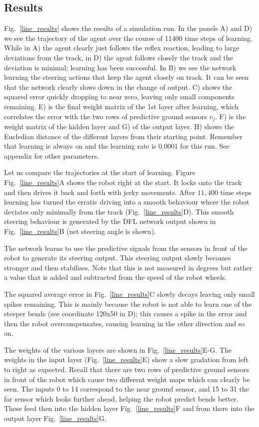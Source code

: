 \documentclass{llncs}
\begin{document}
\subsection{Results}
Fig.~\ref{line_results} shows the results of a simulation run. In the panels
A) and D) we see the trajectory of the agent over the course of 11400 time steps 
of learning. While in A) the agent clearly
just follows the reflex reaction, leading to large deviations from the track,
in D) the agent follows closely the track and the deviation is minimal;
learning has been successful. In B) we see the network learning the steering actions that keep the agent closely on track.
It can be seen that the network clearly slows down in the change of output.
C) shows the squared error quickly dropping to near zero, leaving only small 
components remaining. E) is the final weight matrix of the 1st layer after learning, 
which correlates the error with the two rows of
predictive ground sensors $v_j$. F) is the weight matrix of the hidden layer and G)
of the output layer. H) shows the Eucledian distance of the
different layers from their starting point. Remember that learning is
always on and the learning rate is 0.0001 for this run. See appendix
for other parameters.

Let us compare the trajectories at the start of learning. Figure
Fig.~\ref{line_results}A shows the robot right at the start. It locks
onto the track and then drives it back and forth with jerky
movements. After $11,400$ time steps learning has turned the erratic
driving into a smooth behaviour where the robot deviates only
minimally from the track (Fig.~\ref{line_results}D). This smooth
steering behaviour is generated by the DFL network output 
shown in Fig.~\ref{line_results}B (net steering angle is shown).

The network learns to use the predictive signals from the sensors in
front of the robot to generate its steering output.  This steering 
output slowly becomes stronger and
then stabilises. Note that this is not
measured in degrees but rather a value that is added and subtracted from the
speed of the robot wheels.

The squared average error in Fig.~\ref{line_results}C slowly decays
leaving only small spikes remaining. This is mainly because
the robot is not able to learn one of the steeper bends (see
coordinate 120x50 in D); this causes a spike in the error and
then the robot overcompensates, causing learning in the
other direction and so on.

The weights of the various layers are shown in
Fig.~\ref{line_results}E-G.  The weights in the input layer
(Fig.~\ref{line_results}E) show a slow gradation  from left to right as
expected. Recall that there are two rows of predictive ground
sensors in front of the robot which cause two different weight maps
which can clearly be seen. The inputs 0 to 14 correspond to the near
ground sensor, and 15 to 31 the far sensor which looks further ahead, 
helping the robot predict bends better. These feed then into the 
hidden layer Fig.~\ref{line_results}F
and from there into the output layer Fig.~\ref{line_results}G.
\end{document}
